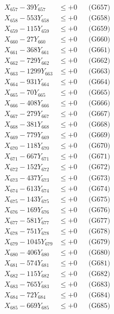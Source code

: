\documentclass[a4paper,10pt]{article}
\begin{document}
{\begin{align}
X_{657} - 39Y_{657} &\leq +0 && \text{(G657)} \\
X_{658} - 553Y_{658} &\leq +0 && \text{(G658)} \\
X_{659} - 115Y_{659} &\leq +0 && \text{(G659)} \\
X_{660} - 27Y_{660} &\leq +0 && \text{(G660)} \\
\allowbreak
X_{661} - 368Y_{661} &\leq +0 && \text{(G661)} \\
X_{662} - 729Y_{662} &\leq +0 && \text{(G662)} \\
X_{663} - 1299Y_{663} &\leq +0 && \text{(G663)} \\
X_{664} - 931Y_{664} &\leq +0 && \text{(G664)} \\
X_{665} - 70Y_{665} &\leq +0 && \text{(G665)} \\
X_{666} - 408Y_{666} &\leq +0 && \text{(G666)} \\
X_{667} - 279Y_{667} &\leq +0 && \text{(G667)} \\
X_{668} - 381Y_{668} &\leq +0 && \text{(G668)} \\
X_{669} - 779Y_{669} &\leq +0 && \text{(G669)} \\
X_{670} - 118Y_{670} &\leq +0 && \text{(G670)} \\
\allowbreak
X_{671} - 667Y_{671} &\leq +0 && \text{(G671)} \\
X_{672} - 152Y_{672} &\leq +0 && \text{(G672)} \\
X_{673} - 437Y_{673} &\leq +0 && \text{(G673)} \\
X_{674} - 613Y_{674} &\leq +0 && \text{(G674)} \\
X_{675} - 143Y_{675} &\leq +0 && \text{(G675)} \\
X_{676} - 169Y_{676} &\leq +0 && \text{(G676)} \\
X_{677} - 581Y_{677} &\leq +0 && \text{(G677)} \\
X_{678} - 751Y_{678} &\leq +0 && \text{(G678)} \\
X_{679} - 1045Y_{679} &\leq +0 && \text{(G679)} \\
X_{680} - 406Y_{680} &\leq +0 && \text{(G680)} \\
\allowbreak
X_{681} - 574Y_{681} &\leq +0 && \text{(G681)} \\
X_{682} - 115Y_{682} &\leq +0 && \text{(G682)} \\
X_{683} - 765Y_{683} &\leq +0 && \text{(G683)} \\
X_{684} - 72Y_{684} &\leq +0 && \text{(G684)} \\
X_{685} - 669Y_{685} &\leq +0 && \text{(G685)} \\

\end{align}}
\end{document}
